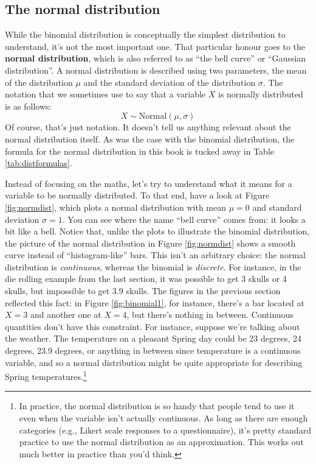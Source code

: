 \documentclass[
  11pt,
  a4paper,
  twoside,symmetric,openright]{book}
\theoremstyle{break}
\theoremstyle{break}
\begin{document}
\subsection{The normal distribution}\label{normal}

While the binomial distribution is conceptually the simplest distribution to understand, it's not the most important one. That particular honour goes to the \textbf{normal distribution}, which is also referred to as ``the bell curve'' or ``Gaussian distribution''. A normal distribution is described using two parameters, the mean of the distribution \(\mu\) and the standard deviation of the distribution \(\sigma\). The notation that we sometimes use to say that a variable \(X\) is normally distributed is as follows:
\[
X \sim \mbox{Normal}(\mu,\sigma)
\]
Of course, that's just notation. It doesn't tell us anything relevant about the normal distribution itself. As was the case with the binomial distribution, the formula for the normal distribution in this book is tucked away in Table \ref{tab:distformulas}.

Instead of focusing on the maths, let's try to understand what it means for a variable to be normally distributed. To that end, have a look at Figure \ref{fig:normdist}, which plots a normal distribution with mean \(\mu = 0\) and standard deviation \(\sigma = 1\). You can see where the name ``bell curve'' comes from: it looks a bit like a bell. Notice that, unlike the plots to illustrate the binomial distribution, the picture of the normal distribution in Figure \ref{fig:normdist} shows a smooth curve instead of ``histogram-like'' bars. This isn't an arbitrary choice: the normal distribution is \emph{continuous}, whereas the binomial is \emph{discrete}. For instance, in the die rolling example from the last section, it was possible to get 3 skulls or 4 skulls, but impossible to get 3.9 skulls. The figures in the previous section reflected this fact: in Figure \ref{fig:binomial1}, for instance, there's a bar located at \(X=3\) and another one at \(X=4\), but there's nothing in between. Continuous quantities don't have this constraint. For instance, suppose we're talking about the weather. The temperature on a pleasant Spring day could be 23 degrees, 24 degrees, 23.9 degrees, or anything in between since temperature is a continuous variable, and so a normal distribution might be quite appropriate for describing Spring temperatures.\footnote{In practice, the normal distribution is so handy that people tend to use it even when the variable isn't actually continuous. As long as there are enough categories (e.g., Likert scale responses to a questionnaire), it's pretty standard practice to use the normal distribution as an approximation. This works out much better in practice than you'd think.}
\end{document}
